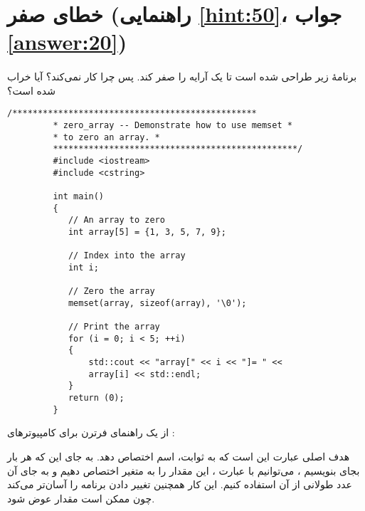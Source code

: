\section[خطای صفر]{خطای صفر \protect{} (راهنمایی \ref{hint:50}، جواب \ref{answer:20})}
\paragraph{}\label{prog:28}
برنامهٔ زیر طراحی شده است تا یک آرایه را صفر کند. پس چرا کار نمی‌کند؟ آیا  خراب شده است؟

\begin{LTR}
    \begin{lstlisting}[style=C++Style]
         /************************************************
         * zero_array -- Demonstrate how to use memset *
         * to zero an array. *
         ************************************************/
         #include <iostream>
         #include <cstring>

         int main()
         {
         	// An array to zero
         	int array[5] = {1, 3, 5, 7, 9};

         	// Index into the array
         	int i;

         	// Zero the array
         	memset(array, sizeof(array), '\0');

         	// Print the array
         	for (i = 0; i < 5; ++i)
         	{
         		std::cout << "array[" << i << "]= " <<
         		array[i] << std::endl;
         	}
         	return (0);
         }
    \end{lstlisting}
\end{LTR}

\begin{tcolorbox}
    از یک راهنمای فرترن برای کامپیوترهای :

    هدف اصلی عبارت  این است که به ثوابت، اسم اختصاص دهد. به جای این که هر بار بجای  بنویسیم ، می‌توانیم با عبارت ، این مقدار را به متغیر  اختصاص دهیم و به جای آن عدد طولانی از آن استفاده کنیم. این کار همچنین تغییر دادن برنامه را آسان‌تر می‌کند چون ممکن است مقدار  عوض شود.
\end{tcolorbox}